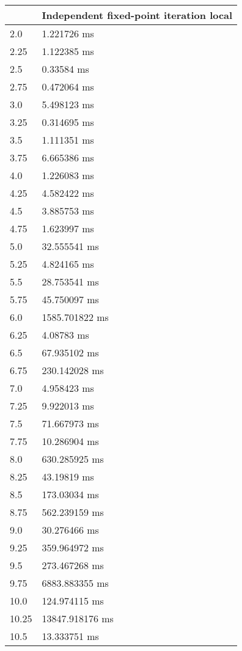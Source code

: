 \begin{multicols}{2}
\begin{tabular}{|l|l|}
		\hline
		& Independent fixed-point iteration local \\ \hline
		2.0 & 1.221726 ms \\ \hline
		2.25 & 1.122385 ms \\ \hline
		2.5 & 0.33584 ms \\ \hline
		2.75 & 0.472064 ms \\ \hline
		3.0 & 5.498123 ms \\ \hline
		3.25 & 0.314695 ms \\ \hline
		3.5 & 1.111351 ms \\ \hline
		3.75 & 6.665386 ms \\ \hline
		4.0 & 1.226083 ms \\ \hline
		4.25 & 4.582422 ms \\ \hline
		4.5 & 3.885753 ms \\ \hline
		4.75 & 1.623997 ms \\ \hline
		5.0 & 32.555541 ms \\ \hline
		5.25 & 4.824165 ms \\ \hline
		5.5 & 28.753541 ms \\ \hline
		5.75 & 45.750097 ms \\ \hline
		6.0 & 1585.701822 ms \\ \hline
		6.25 & 4.08783 ms \\ \hline
		6.5 & 67.935102 ms \\ \hline
		6.75 & 230.142028 ms \\ \hline
		7.0 & 4.958423 ms \\ \hline
		7.25 & 9.922013 ms \\ \hline
		7.5 & 71.667973 ms \\ \hline
		7.75 & 10.286904 ms \\ \hline
		8.0 & 630.285925 ms \\ \hline
		8.25 & 43.19819 ms \\ \hline
		8.5 & 173.03034 ms \\ \hline
		8.75 & 562.239159 ms \\ \hline
		9.0 & 30.276466 ms \\ \hline
		9.25 & 359.964972 ms \\ \hline
		9.5 & 273.467268 ms \\ \hline
		9.75 & 6883.883355 ms \\ \hline
		10.0 & 124.974115 ms \\ \hline
		10.25 & 13847.918176 ms \\ \hline
		10.5 & 13.333751 ms \\ \hline

\end{tabular}
\end{multicols}
